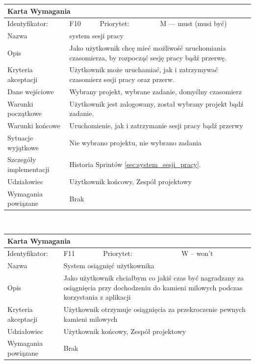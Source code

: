 \documentclass[a4paper,11pt]{report}
\begin{document}
		\begin{tabular}{|p{3cm}|p{2cm}|p{2cm}|p{6cm}|}
		\hline
		\multicolumn{4}{|p{12 cm}|}{Karta Wymagania}\\
		\hline
		Identyfikator: & F10 & Priorytet: & M — must (musi być)\\
		\hline
		Nazwa & \multicolumn{3}{|p{10 cm}|}{system sesji pracy}\\
		\hline
		Opis & \multicolumn{3}{|p{10 cm}|}{Jako użytkownik chcę mieć możliwość uruchomiania czasomierza, by rozpocząć sesję pracy bądź przerwę.}\\
		\hline
		Kryteria akceptacji & \multicolumn{3}{|p{10 cm}|}{Użytkownik może uruchamiać, jak i zatrzymywać czasomierz sesji pracy oraz przerw.}\\
		\hline
		Dane wejściowe & \multicolumn{3}{|p{10 cm}|}{Wybrany projekt, wybrane zadanie, domyślny czasomierz}\\
		\hline
		Warunki początkowe & \multicolumn{3}{|p{10 cm}|}{Użytkownik jest zalogowany, został wybrany projekt bądź zadanie.}\\
		\hline
		Warunki końcowe & \multicolumn{3}{|p{10 cm}|}{Uruchomienie, jak i zatrzymanie sesji pracy bądź przerwy}\\
		\hline
		Sytuacje wyjątkowe & \multicolumn{3}{|p{10 cm}|}{Nie wybrano projektu, nie wybrano zadania}\\
		\hline
		Szczegóły implementacji & \multicolumn{3}{|p{10 cm}|}{Historia Sprintów \ref{sec:system_sesji_pracy}.}\\
		\hline
		Udziałowiec & \multicolumn{3}{|p{10 cm}|}{Użytkownik końcowy, Zespół projektowy}\\
		\hline
		Wymagania powiązane & \multicolumn{3}{|p{10 cm}|}{Brak}\\
		\hline
		\end{tabular}\\
		\newline
		\vspace*{0,2 cm}
		\newline
		\begin{tabular}{|p{3cm}|p{2cm}|p{2cm}|p{6cm}|}
		\hline
		\multicolumn{4}{|p{12 cm}|}{Karta Wymagania}\\
		\hline
		Identyfikator: & F11 & Priorytet: & W – won't \\
		\hline
		Nazwa & \multicolumn{3}{|p{10 cm}|}{System osiągnięć użytkownika}\\
		\hline
		Opis & \multicolumn{3}{|p{10 cm}|}{Jako użytkownik chciałbym co jakiś czas być nagradzany za osiągnięcia przy dochodzeniu do kamieni milowych podczas korzystania z aplikacji}\\
		\hline
		Kryteria akceptacji & \multicolumn{3}{|p{10 cm}|}{Użytkownik otrzymuje osiągnięcia za przekroczenie pewnych kamieni milowych}\\
		\hline
		Udziałowiec & \multicolumn{3}{|p{10 cm}|}{Użytkownik końcowy, Zespół projektowy}\\
		\hline
		Wymagania powiązane & \multicolumn{3}{|p{10 cm}|}{Brak}\\
		\hline
		\end{tabular}\\
\end{document}
